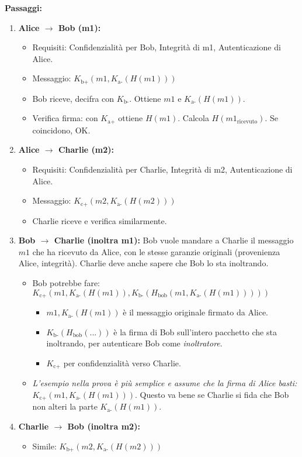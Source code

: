 \textbf{Passaggi:}
\begin{enumerate}[label=\arabic*.]
    \item \textbf{Alice $\to$ Bob (m1):}
    \begin{itemize}
        \item Requisiti: Confidenzialità per Bob, Integrità di m1, Autenticazione di Alice.
        \item Messaggio: $K_{\text{b+}}(m1, K_{\text{a-}}(H(m1)))$
        \item Bob riceve, decifra con $K_{\text{b-}}$. Ottiene $m1$ e $K_{\text{a-}}(H(m1))$.
        \item Verifica firma: con $K_{\text{a+}}$ ottiene $H(m1)$. Calcola $H(m1_{\text{ricevuto}})$. Se coincidono, OK.
    \end{itemize}
    \item \textbf{Alice $\to$ Charlie (m2):}
    \begin{itemize}
        \item Requisiti: Confidenzialità per Charlie, Integrità di m2, Autenticazione di Alice.
        \item Messaggio: $K_{\text{c+}}(m2, K_{\text{a-}}(H(m2)))$
        \item Charlie riceve e verifica similarmente.
    \end{itemize}
    \item \textbf{Bob $\to$ Charlie (inoltra m1):}
    Bob vuole mandare a Charlie il messaggio $m1$ che ha ricevuto da Alice, con le stesse garanzie originali (provenienza Alice, integrità). Charlie deve anche sapere che Bob lo sta inoltrando.
    \begin{itemize}
        \item Bob potrebbe fare: $K_{\text{c+}}( m1, K_{\text{a-}}(H(m1)), K_{\text{b-}}(H_{\text{bob}}(m1, K_{\text{a-}}(H(m1)))) )$
        \begin{itemize}
            \item $m1, K_{\text{a-}}(H(m1))$ è il messaggio originale firmato da Alice.
            \item $K_{\text{b-}}(H_{\text{bob}}(...))$ è la firma di Bob sull'intero pacchetto che sta inoltrando, per autenticare Bob come \textit{inoltratore}.
            \item $K_{\text{c+}}$ per confidenzialità verso Charlie.
        \end{itemize}
        \item \textit{L'esempio nella prova è più semplice e assume che la firma di Alice basti:} $K_{\text{c+}}(m1, K_{\text{a-}}(H(m1)))$. Questo va bene se Charlie si fida che Bob non alteri la parte $K_{\text{a-}}(H(m1))$.
    \end{itemize}
    \item \textbf{Charlie $\to$ Bob (inoltra m2):}
    \begin{itemize}
        \item Simile: $K_{\text{b+}}(m2, K_{\text{a-}}(H(m2)))$
    \end{itemize}
\end{enumerate}

